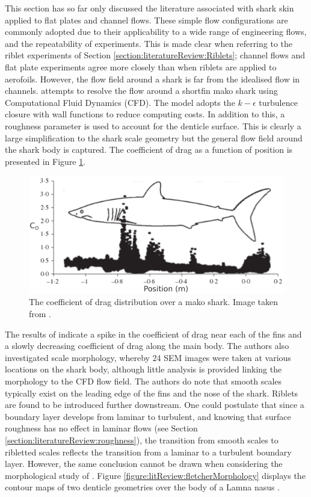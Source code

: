 \documentclass[12pt,oneside,a4paper]{article}
\begin{document}
This section has so far only discussed the literature associated with shark skin applied to flat plates and channel flows. These simple flow configurations are commonly adopted due to their applicability to a wide range of engineering flows, and the repeatability of experiments. This is made clear when referring to the riblet experiments of Section \ref{section:literatureReview:Riblets}; channel flows and flat plate experiments agree more closely than when riblets are applied to aerofoils. However, the flow field around a shark is far from the idealised flow in channels. \cite{diez2015} attempts to resolve the flow around a shortfin mako shark using Computational Fluid Dynamics (CFD). The model adopts the $k-\epsilon$ turbulence closure with wall functions to reduce computing costs. In addition to this, a roughness parameter is used to account for the denticle surface. This is clearly a large simplification to the shark scale geometry but the general flow field around the shark body is captured. The coefficient of drag as a function of position is presented in Figure \ref{figure:litReview:makoSharkFlowField}.
%
\begin{figure}[!t]
\centering
\includegraphics[width=0.8\linewidth]{images/litReview/makoSharkFlowField.png}
\caption{The coefficient of drag distribution over a mako shark. Image taken from \cite{diez2015}.}
\label{figure:litReview:makoSharkFlowField}
\end{figure}
%
 The results of \cite{diez2015} indicate a spike in the coefficient of drag near each of the fins and a slowly decreasing coefficient of drag along the main body. The authors also investigated scale morphology, whereby 24 SEM images were taken at various locations on the shark body, although little analysis is provided linking the morphology to the CFD flow field. The authors do note that smooth scales typically exist on the leading edge of the fins and the nose of the shark. Riblets are found to be introduced further downstream. One could postulate that since a boundary layer develops from laminar to turbulent, and knowing that surface roughness has no effect in laminar flows (see Section \ref{section:literatureReview:roughness}), the transition from smooth scales to ribletted scales reflects the transition from a laminar to a turbulent boundary layer. However, the same conclusion cannot be drawn when considering the morphological study of \cite{fletcher2014phd}. Figure \ref{figure:litReview:fletcherMorphology} displays the contour maps of two denticle geometries over the body of a Lamna nasus \citep{fletcher2014phd}. 
\end{document}
